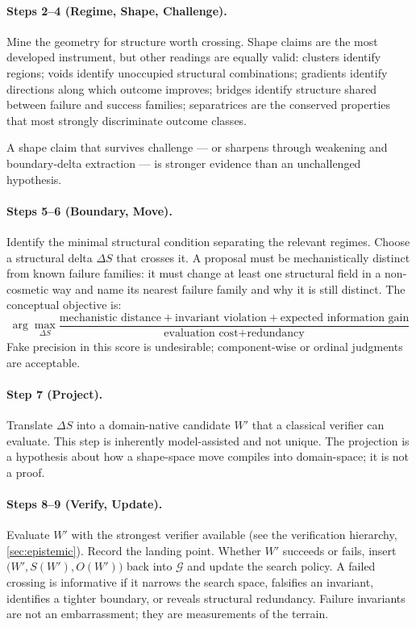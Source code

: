 \documentclass[11pt]{article}
\theoremstyle{gowthm}
\theoremstyle{gowplain}
\begin{document}
\paragraph{Steps 2--4 (Regime, Shape, Challenge).}
Mine the geometry for structure worth crossing. Shape claims are the most
developed instrument, but other readings are equally valid: clusters identify
regions; voids identify unoccupied structural combinations; gradients identify
directions along which outcome improves; bridges identify structure shared
between failure and success families; separatrices are the conserved properties
that most strongly discriminate outcome classes.

A shape claim that survives challenge --- or sharpens through weakening and
boundary-delta extraction --- is stronger evidence than an unchallenged
hypothesis.

\paragraph{Steps 5--6 (Boundary, Move).}
Identify the minimal structural condition separating the relevant regimes.
Choose a structural delta $\Delta S$ that crosses it. A proposal must be
mechanistically distinct from known failure families: it must change at least
one structural field in a non-cosmetic way and name its nearest failure family
and why it is still distinct. The conceptual objective is:
\[
\arg\max_{\Delta S}
\frac{\text{mechanistic distance} + \text{invariant violation} +
      \text{expected information gain}}{\text{evaluation cost} + \text{redundancy}}
\]
Fake precision in this score is undesirable; component-wise or ordinal
judgments are acceptable.

\paragraph{Step 7 (Project).}
Translate $\Delta S$ into a domain-native candidate $W'$ that a classical
verifier can evaluate. This step is inherently model-assisted and not unique.
The projection is a hypothesis about how a shape-space move compiles into
domain-space; it is not a proof.

\paragraph{Steps 8--9 (Verify, Update).}
Evaluate $W'$ with the strongest verifier available (see the verification
hierarchy, \cref{sec:epistemic}). Record the landing point. Whether $W'$
succeeds or fails, insert $\bigl(W', S(W'), O(W')\bigr)$ back into
$\mathcal{G}$ and update the search policy. A failed crossing is informative
if it narrows the search space, falsifies an invariant, identifies a tighter
boundary, or reveals structural redundancy. Failure invariants are not an
embarrassment; they are measurements of the terrain.
\end{document}
